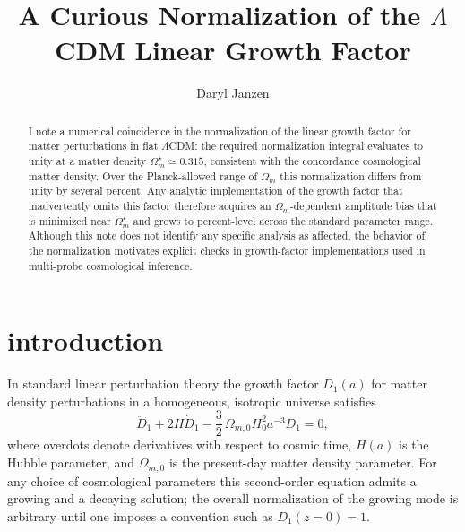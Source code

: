 \documentclass[twocolumn]{aastex701}
\begin{document}
\title{A Curious Normalization of the $\Lambda$CDM Linear Growth Factor}

\author[0000-0003-0549-3281]{Daryl Janzen}

\begin{abstract}
I note a numerical coincidence in the normalization of the linear growth factor for matter perturbations in flat $\Lambda$CDM: the required normalization integral evaluates to unity at a matter density $\Omega_m^\star \simeq 0.315$, consistent with the concordance cosmological matter density. Over the Planck-allowed range of $\Omega_m$ this normalization differs from unity by several percent. Any analytic implementation of the growth factor that inadvertently omits this factor therefore acquires an $\Omega_m$-dependent amplitude bias that is minimized near $\Omega_m^\star$ and grows to percent-level across the standard parameter range. Although this note does not identify any specific analysis as affected, the behavior of the normalization motivates explicit checks in growth-factor implementations used in multi-probe cosmological inference.
\end{abstract}


\section{introduction}

In standard linear perturbation theory the growth factor $D_1(a)$ for matter density perturbations in a homogeneous, isotropic universe satisfies
\begin{equation}
\ddot{D}_1 + 2 H \dot{D}_1 - \frac{3}{2}\,\Omega_{m,0} H_0^2 a^{-3} D_1 = 0,
\label{eq:growth}
\end{equation}
where overdots denote derivatives with respect to cosmic time, $H(a)$ is the Hubble parameter, and $\Omega_{m,0}$ is the present-day matter density parameter. For any choice of cosmological parameters this second-order equation admits a growing and a decaying solution; the overall normalization of the growing mode is arbitrary until one imposes a convention such as $D_1(z=0)=1$.
\end{document}
